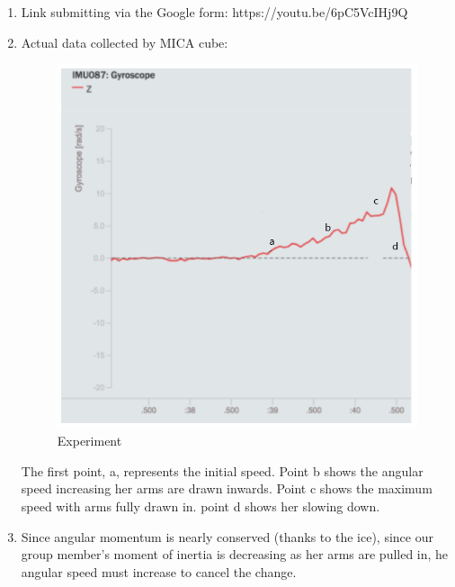 \documentclass{article}
\begin{document}
\begin{enumerate}[1.]
    \item Link submitting via the Google form: https://youtu.be/6pC5VcIHj9Q

    \item Actual data collected by MICA cube:

        \begin{figure}[H]
            \centering
            \includegraphics[scale=0.5]{"Experiment"}
            \caption{Experiment}
        \end{figure}

        The first point, a, represents the initial speed. Point b shows the
        angular speed increasing her arms are drawn inwards. Point c shows the
        maximum speed with arms fully drawn in. point d shows her slowing down.

    \item Since angular momentum is nearly conserved (thanks to the ice), since
        our group member's moment of inertia is decreasing as her arms are
        pulled in, he angular speed must increase to cancel the change.

\end{enumerate}
\end{document}
